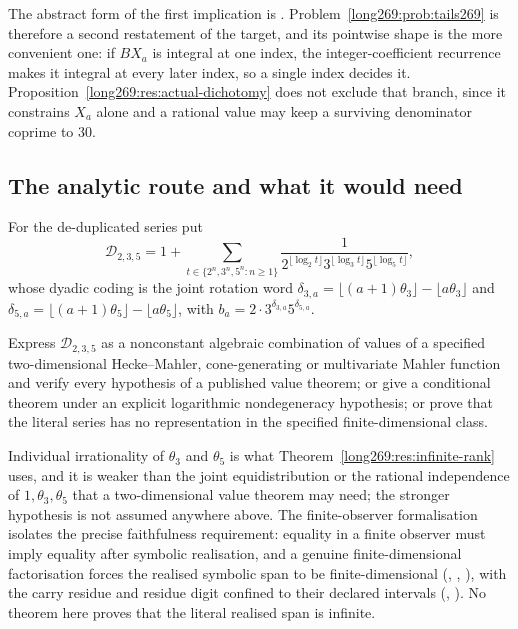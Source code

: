 \noindent The abstract form of the first implication is
.
Problem~\ref{long269:prob:tails269} is therefore a second restatement of the target,
and its pointwise shape is the more convenient one: if $BX_a$ is integral at one index, the integer-coefficient recurrence
makes it integral at every later index, so a single index decides it.
Proposition~\ref{long269:res:actual-dichotomy} does not exclude that branch, since it
constrains $X_a$ alone and a rational value may keep a surviving denominator
coprime to $30$.

\subsection{The analytic route and what it would need}

For the de-duplicated series put
\[
 \mathcal D_{2,3,5}=1+
 \sum_{t\in\{2^{n},3^{n},5^{n}:n\ge1\}}
 \frac{1}{2^{\lfloor\log_2t\rfloor}3^{\lfloor\log_3t\rfloor}
           5^{\lfloor\log_5t\rfloor}} ,
\]
whose dyadic coding is the joint rotation word
$\delta_{3,a}=\lfloor(a+1)\theta_3\rfloor-\lfloor a\theta_3\rfloor$ and
$\delta_{5,a}=\lfloor(a+1)\theta_5\rfloor-\lfloor a\theta_5\rfloor$, with
$b_a=2\cdot3^{\delta_{3,a}}5^{\delta_{5,a}}$.

\begin{problem}
\label{long269:prob:representation}
Express $\mathcal D_{2,3,5}$ as a nonconstant algebraic combination of values
of a specified two-dimensional Hecke--Mahler, cone-generating or multivariate
Mahler function and verify every hypothesis of a published value theorem; or
give a conditional theorem under an explicit logarithmic nondegeneracy
hypothesis; or prove that the literal series has no representation in the
specified finite-dimensional class.
\end{problem}

Individual irrationality of $\theta_3$ and $\theta_5$ is what
Theorem~\ref{long269:res:infinite-rank} uses, and it is weaker than the joint
equidistribution or the rational independence of $1,\theta_3,\theta_5$ that a
two-dimensional value theorem may need; the stronger hypothesis is not assumed
anywhere above.  The finite-observer formalisation isolates the precise
faithfulness requirement: equality in a finite observer must imply equality
after symbolic realisation, and a genuine finite-dimensional factorisation
forces the realised symbolic span to be finite-dimensional
(,
,
),
with the carry residue and residue digit confined to their declared intervals
(,
).  No theorem here proves that the literal realised span is infinite.

